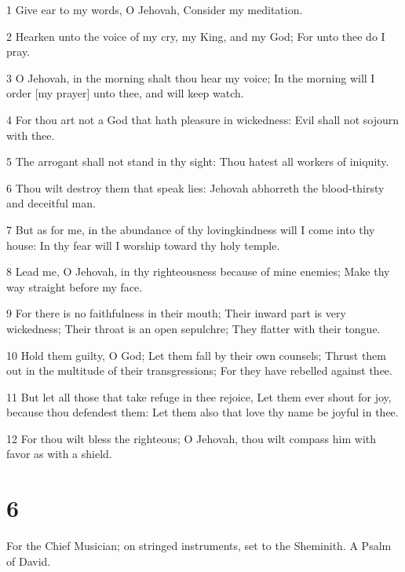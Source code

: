 \par 1 Give ear to my words, O Jehovah, Consider my meditation.
\par 2 Hearken unto the voice of my cry, my King, and my God; For unto thee do I pray.
\par 3 O Jehovah, in the morning shalt thou hear my voice; In the morning will I order [my prayer] unto thee, and will keep watch.
\par 4 For thou art not a God that hath pleasure in wickedness: Evil shall not sojourn with thee.
\par 5 The arrogant shall not stand in thy sight: Thou hatest all workers of iniquity.
\par 6 Thou wilt destroy them that speak lies: Jehovah abhorreth the blood-thirsty and deceitful man.
\par 7 But as for me, in the abundance of thy lovingkindness will I come into thy house: In thy fear will I worship toward thy holy temple.
\par 8 Lead me, O Jehovah, in thy righteousness because of mine enemies; Make thy way straight before my face.
\par 9 For there is no faithfulness in their mouth; Their inward part is very wickedness; Their throat is an open sepulchre; They flatter with their tongue.
\par 10 Hold them guilty, O God; Let them fall by their own counsels; Thrust them out in the multitude of their transgressions; For they have rebelled against thee.
\par 11 But let all those that take refuge in thee rejoice, Let them ever shout for joy, because thou defendest them: Let them also that love thy name be joyful in thee.
\par 12 For thou wilt bless the righteous; O Jehovah, thou wilt compass him with favor as with a shield.

\chapter{6}

\par For the Chief Musician; on stringed instruments, set to the Sheminith. A Psalm of David.


